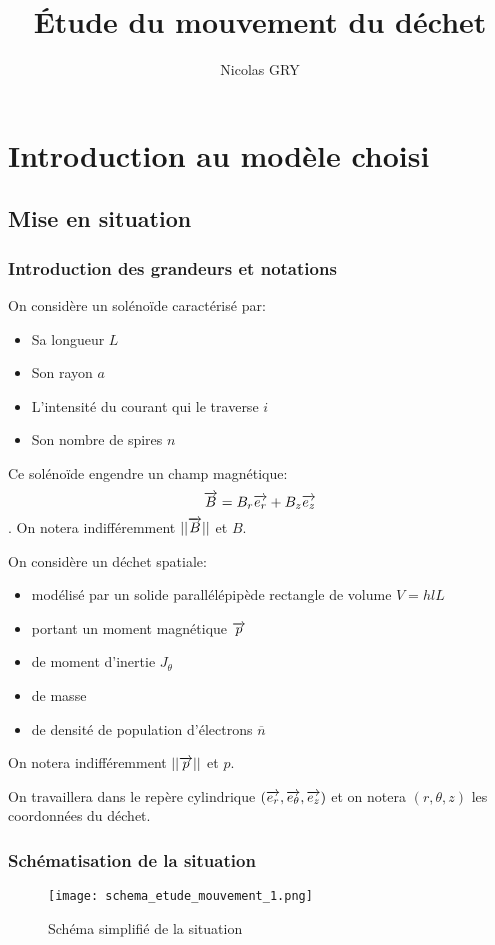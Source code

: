 \documentclass{report}
\author{Nicolas GRY}
\title{Étude du mouvement du déchet}
\begin{document}
\maketitle
\tableofcontents
\newpage
\chapter{Introduction au modèle choisi}
\section{Mise en situation}
\subsection{Introduction des grandeurs et notations}

On considère un solénoïde caractérisé par:
\begin{itemize}
    \item Sa longueur $L$
    \item Son rayon $a$
    \item L'intensité du courant qui le traverse $i$
    \item Son nombre de spires $n$ 
\end{itemize}
Ce solénoïde engendre un champ magnétique:
 $$\overrightarrow{B} = B_r \overrightarrow{e_r} + B_z \overrightarrow{e_z}$$.
On notera indifféremment $||\overrightarrow{B}||$ et $B$.

On considère un déchet spatiale:
\begin{itemize}
    \item modélisé par un solide parallélépipède rectangle de volume $V=hlL$
    \item portant un moment magnétique $\overrightarrow{p}$
    \item de moment d'inertie $J_\theta$
    \item de masse 
    \item de densité de population d'électrons $\overline{n}$
\end{itemize} 
On notera indifféremment $||\overrightarrow{p}||$ et $p$.

On travaillera dans le repère cylindrique $(\overrightarrow{e_r},\overrightarrow{e_\theta},\overrightarrow{e_z})$ et on notera $(r,\theta,z)$ les coordonnées du déchet.

\subsection{Schématisation de la situation}

\begin{figure}[h]
    \centering
    \texttt{[image: schema\_etude\_mouvement\_1.png]}
    \caption{Schéma simplifié de la situation}
\end{figure}  
\end{document}
